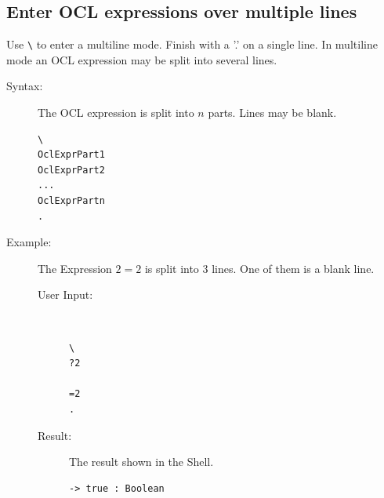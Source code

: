 \documentclass[a4paper,titlepage,oneside,final]{scrreprt} %
\begin{document}
\subsection{Enter OCL expressions over multiple lines}
Use \verb+\+ to enter a multiline mode. Finish with a '.' on a single line.
In multiline mode an OCL expression may be split into several lines.
\begin{description}
\item[Syntax:] The OCL expression is split into $n$ parts. Lines may be blank.
\begin{verbatim}
\
OclExprPart1
OclExprPart2
...
OclExprPartn
.
\end{verbatim}
\item[Example:] The Expression $2=2$ is split into 3 lines. One of them is a blank line.
\begin{description}
\item[User Input:] ~
\begin{verbatim}
\
?2

=2
.
\end{verbatim}
\item[Result:] The result shown in the Shell.
\begin{verbatim}
-> true : Boolean
\end{verbatim}
\end{description}
\end{description}
\end{document}
